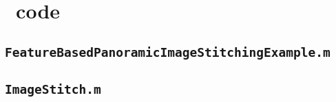 \clearpage
\section{\Matlab\ code}
\label{app:C}

\subsection{\lstinline{FeatureBasedPanoramicImageStitchingExample.m}}\label{app:C1}


\subsection{\lstinline{ImageStitch.m}}\label{app:C2}
